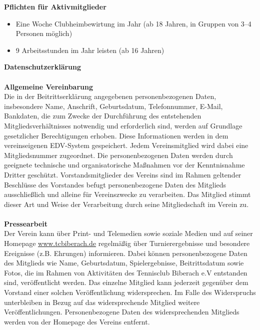 \begin{Form}
	{
		\huge
		\centering
		\textbf{Pflichten für Aktivmitglieder}\\
	}
	\noindent
	\begin{itemize}
		\item Eine Woche Clubheimbewirtung im Jahr (ab 18 Jahren, in Gruppen von 3--4 Personen möglich)
		\item 9 Arbeitsstunden im Jahr leisten (ab 16 Jahren)
	\end{itemize}
	{
		\huge
		\centering
		\textbf{Datenschutzerklärung}\\\ \\
	}
	\noindent
	\textbf{\Large Allgemeine Vereinbarung}\\
	Die in der Beitrittserklärung angegebenen personenbezogenen Daten, insbesondere Name, Anschrift, Geburtsdatum, Telefonnummer, E-Mail, Bankdaten, die zum Zwecke der Durchführung des entstehenden Mitgliedsverhältnisses notwendig und erforderlich sind, werden auf Grundlage gesetzlicher Berechtigungen erhoben. Diese Informationen werden in dem vereinseigenen EDV-System gespeichert. Jedem Vereinsmitglied wird dabei eine Mitgliedsnummer zugeordnet. Die personenbezogenen Daten werden durch geeignete technische und organisatorische Maßnahmen vor der Kenntnisnahme Dritter geschützt. Vorstandsmitglieder des Vereins sind im Rahmen geltender Beschlüsse des Vorstandes befugt personenbezogene Daten des Mitglieds ausschließlich und alleine für Vereinszwecke zu verarbeiten. Das Mitglied stimmt dieser Art und Weise der Verarbeitung durch seine Mitgliedschaft im Verein zu.\\\\
	\noindent
	\textbf{\Large Pressearbeit}\\
	Der Verein kann über Print- und Telemedien sowie soziale Medien und auf seiner Homepage \url{www.tcbiberach.de} regelmäßig über Turnierergebnisse und besondere Ereignisse (z.B. Ehrungen) informieren.	Dabei können personenbezogene Daten des Mitglieds wie Name, Geburtsdatum, Spielergebnisse, Beitrittsdatum sowie Fotos, die im Rahmen von Aktivitäten des Tennisclub Biberach e.V entstanden sind, veröffentlicht werden. Das einzelne Mitglied kann jederzeit gegenüber dem Vorstand einer solchen Veröffentlichung widersprechen. Im Falle des Widerspruchs unterbleiben in Bezug auf das widersprechende Mitglied weitere Veröffentlichungen. Personenbezogene Daten des widersprechenden Mitglieds werden von der Homepage des Vereins entfernt.\\\\

\end{Form}
